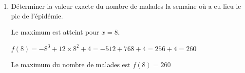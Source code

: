 \documentclass[10pt]{article}
\begin{document}
\begin{enumerate}
\begin{enumerate}
		\item Déterminer la valeur exacte du nombre de malades la semaine où a eu lieu le pic de l'épidémie.

		Le maximum est atteint pour $x=8$.

		$f(8) = -8^3 + 12 \times 8^2 + 4 = -512 + 768 + 4 = 256 + 4 = 260$

		Le maximum du nombre de malades est $f(8) = 260$

	\end{enumerate}
\end{enumerate}
\end{document}
